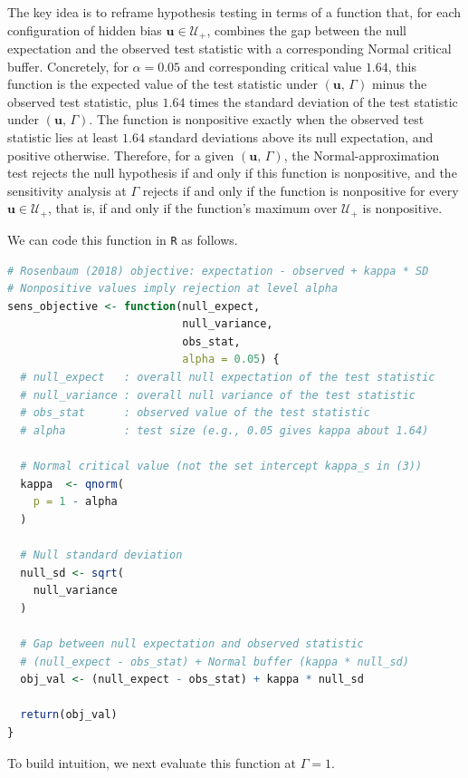 \documentclass[twoside,11pt]{article}
\begin{document}
The key idea is to reframe hypothesis testing in terms of a function
that, for each configuration of hidden bias
\(\bm{u} \in \mathcal{U}_{+}\), combines the gap between the null
expectation and the observed test statistic with a corresponding Normal
critical buffer. Concretely, for \(\alpha = 0.05\) and corresponding
critical value \(1.64\), this function is the expected value of the test
statistic under \((\bm{u}, \, \Gamma)\) minus the observed test
statistic, plus \(1.64\) times the standard deviation of the test
statistic under \((\bm{u}, \, \Gamma)\). The function is nonpositive
exactly when the observed test statistic lies at least \(1.64\) standard
deviations above its null expectation, and positive otherwise.
Therefore, for a given \((\bm{u}, \, \Gamma )\), the Normal-approximation test rejects
the null hypothesis if and only if this function is nonpositive, and the
sensitivity analysis at \(\Gamma\) rejects if and only if the function is
nonpositive for every \(\bm{u} \in \mathcal{U}_{+}\), that is, if and only if the function's
maximum over \(\mathcal{U}_{+}\) is nonpositive.

We can code this function in \texttt{R} as follows.



\begin{lstlisting}[language=R]
# Rosenbaum (2018) objective: expectation - observed + kappa * SD
# Nonpositive values imply rejection at level alpha
sens_objective <- function(null_expect,
                           null_variance,
                           obs_stat,
                           alpha = 0.05) {
  # null_expect   : overall null expectation of the test statistic
  # null_variance : overall null variance of the test statistic
  # obs_stat      : observed value of the test statistic
  # alpha         : test size (e.g., 0.05 gives kappa about 1.64)

  # Normal critical value (not the set intercept kappa_s in (3))
  kappa  <- qnorm(
    p = 1 - alpha
  )

  # Null standard deviation
  null_sd <- sqrt(
    null_variance
  )

  # Gap between null expectation and observed statistic
  # (null_expect - obs_stat) + Normal buffer (kappa * null_sd)
  obj_val <- (null_expect - obs_stat) + kappa * null_sd

  return(obj_val)
}
\end{lstlisting}



To build intuition, we next evaluate this function at \(\Gamma = 1\).
\end{document}
